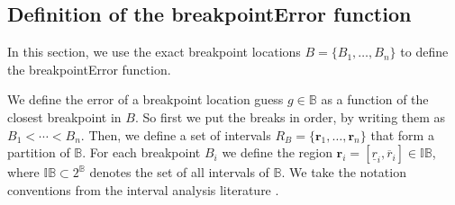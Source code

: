 \documentclass{article}
\renewcommand{\r}{ \mathbf{ r} }
\newcommand{\rileft}[1][i]{\underline r_{#1}}
\newcommand{\riright}[1][i]{\overline r_{#1}}
\begin{document}


\newpage

\subsection{Definition of the breakpointError function}
\label{sec:breakpoint_error}

In this section, we use the exact breakpoint locations $B=\{B_1,
\dots, B_n\}$ to define the breakpointError function.

We define the error of a breakpoint location guess $g\in\mathbb
B$ as a function of the closest breakpoint in $B$. So
first we put the breaks in order, by writing them as $B_1<\cdots<
B_n$. Then, we define a set of intervals
$R_B=\{\r_1,\dots,\r_n\}$ that form a partition of $\mathbb B$. For each
breakpoint $B_i$ we define the region
${\r}_i=[\rileft,\riright]\in\mathbb I \mathbb B$, where $\mathbb
I\mathbb B\subset 2^{\mathbb B}$ denotes the set of all intervals of
$\mathbb B$. We take the notation conventions from the interval
analysis literature \citep{intervals}.
\end{document}
